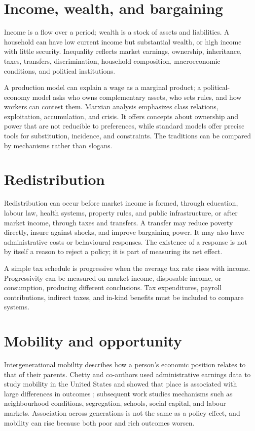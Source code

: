 \documentclass[11pt,oneside,openany]{book}
\begin{document}
\section{Income, wealth, and bargaining}

Income is a flow over a period; wealth is a stock of assets and liabilities. A household can have low current income but substantial wealth, or high income with little security. Inequality reflects market earnings, ownership, inheritance, taxes, transfers, discrimination, household composition, macroeconomic conditions, and political institutions.

A production model can explain a wage as a marginal product; a political-economy model asks who owns complementary assets, who sets rules, and how workers can contest them. Marxian analysis emphasizes class relations, exploitation, accumulation, and crisis. It offers concepts about ownership and power that are not reducible to preferences, while standard models offer precise tools for substitution, incidence, and constraints. The traditions can be compared by mechanisms rather than slogans.

\section{Redistribution}

Redistribution can occur before market income is formed, through education, labour law, health systems, property rules, and public infrastructure, or after market income, through taxes and transfers. A transfer may reduce poverty directly, insure against shocks, and improve bargaining power. It may also have administrative costs or behavioural responses. The existence of a response is not by itself a reason to reject a policy; it is part of measuring its net effect.

A simple tax schedule is progressive when the average tax rate rises with income. Progressivity can be measured on market income, disposable income, or consumption, producing different conclusions. Tax expenditures, payroll contributions, indirect taxes, and in-kind benefits must be included to compare systems.

\section{Mobility and opportunity}

Intergenerational mobility describes how a person's economic position relates to that of their parents. Chetty and co-authors used administrative earnings data to study mobility in the United States and showed that place is associated with large differences in outcomes \cite{chetty2014}; subsequent work studies mechanisms such as neighbourhood conditions, segregation, schools, social capital, and labour markets. Association across generations is not the same as a policy effect, and mobility can rise because both poor and rich outcomes worsen.
\end{document}
